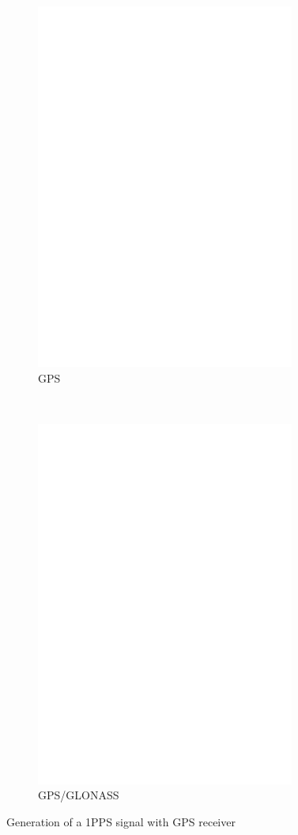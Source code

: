 \begin{figure}[H]
  \begin{subfigure}[b]{9cm}
    \centering
    \includegraphics[width=8.5cm]{../FIG/GPS_UP501.eps}
    \caption{GPS}
  \end{subfigure}
  ~
  \begin{subfigure}[b]{9cm}
    \centering
    \includegraphics[width=8.5cm]{../FIG/GPS_GNS701.eps}
    \caption{GPS/GLONASS}
  \end{subfigure}
  \caption{Generation of a 1PPS signal with GPS receiver }
  \label{fig:GPS-1PPS}
\end{figure}
